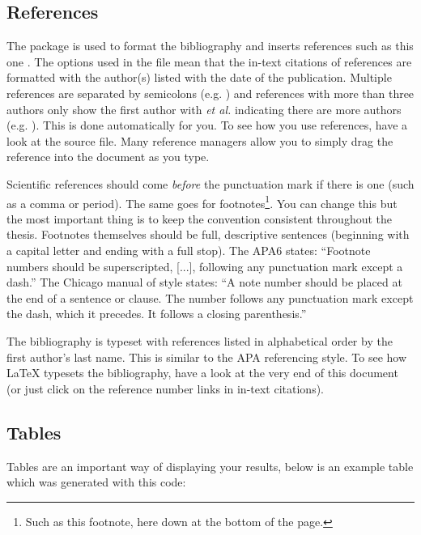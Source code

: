 \subsection{References}

The  package is used to format the bibliography and inserts references such as this one \parencite{Reference1}. The options used in the  file mean that the in-text citations of references are formatted with the author(s) listed with the date of the publication. Multiple references are separated by semicolons (e.g. \parencite{Reference2, Reference1}) and references with more than three authors only show the first author with \emph{et al.} indicating there are more authors (e.g. \parencite{Reference3}). This is done automatically for you. To see how you use references, have a look at the  source file. Many reference managers allow you to simply drag the reference into the document as you type.

Scientific references should come \emph{before} the punctuation mark if there is one (such as a comma or period). The same goes for footnotes\footnote{Such as this footnote, here down at the bottom of the page.}. You can change this but the most important thing is to keep the convention consistent throughout the thesis. Footnotes themselves should be full, descriptive sentences (beginning with a capital letter and ending with a full stop). The APA6 states: \enquote{Footnote numbers should be superscripted, [...], following any punctuation mark except a dash.} The Chicago manual of style states: \enquote{A note number should be placed at the end of a sentence or clause. The number follows any punctuation mark except the dash, which it precedes. It follows a closing parenthesis.}

The bibliography is typeset with references listed in alphabetical order by the first author's last name. This is similar to the APA referencing style. To see how \LaTeX{} typesets the bibliography, have a look at the very end of this document (or just click on the reference number links in in-text citations).


\subsection{Tables}

Tables are an important way of displaying your results, below is an example table which was generated with this code:

